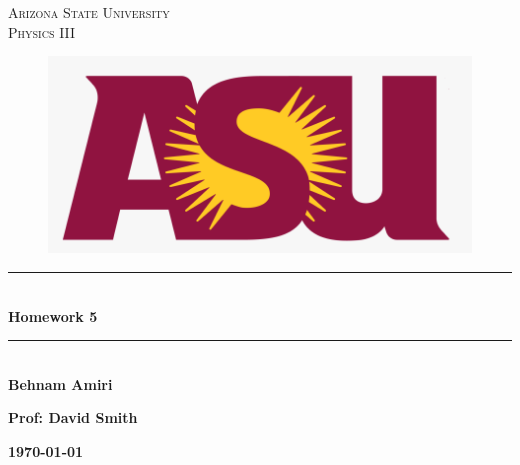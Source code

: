 \documentclass[fleqn]{article}
\begin{document}
  \begin{titlepage}

    \newcommand{\HRule}{\rule{\linewidth}{0.5mm}} %

    \center %
    

    \textsc{\LARGE Arizona State University}\\[1.5cm] %

    \textsc{\LARGE Physics III }\\[1.5cm] %


    \begin{figure}
      \includegraphics[width=\linewidth]{asu.png}
    \end{figure}


    \HRule \\[0.4cm]
    { \huge \bfseries Homework 5}\\[0.4cm] 
    \HRule \\[1.5cm]
    
    \textbf{Behnam Amiri}

    \bigbreak

    \textbf{Prof: David Smith}

    \bigbreak


    \textbf{{\large \today}\\[2cm]}

    \vfill %

  \end{titlepage}
\end{document}
